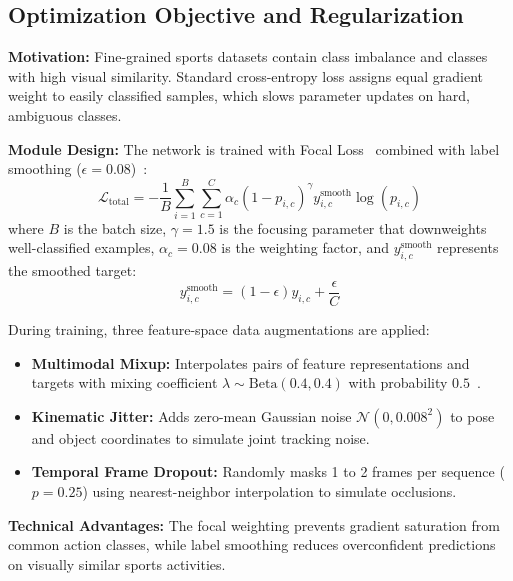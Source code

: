 \documentclass[conference]{IEEEtran}
\begin{document}
\subsection{Optimization Objective and Regularization}
\textbf{Motivation:} Fine-grained sports datasets contain class imbalance and classes with high visual similarity. Standard cross-entropy loss assigns equal gradient weight to easily classified samples, which slows parameter updates on hard, ambiguous classes.

\textbf{Module Design:} The network is trained with Focal Loss~\cite{lin2017focal} combined with label smoothing ($\epsilon = 0.08$)~\cite{szegedy2016rethinking}:
\begin{equation}
\mathcal{L}_{\text{total}} = -\frac{1}{B} \sum_{i=1}^B \sum_{c=1}^C \alpha_c (1 - p_{i, c})^\gamma y_{i, c}^{\text{smooth}} \log(p_{i, c})
\end{equation}
where $B$ is the batch size, $\gamma = 1.5$ is the focusing parameter that downweights well-classified examples, $\alpha_c = 0.08$ is the weighting factor, and $y_{i, c}^{\text{smooth}}$ represents the smoothed target:
\begin{equation}
y_{i, c}^{\text{smooth}} = (1 - \epsilon) y_{i, c} + \frac{\epsilon}{C}
\end{equation}

During training, three feature-space data augmentations are applied:
\begin{itemize}
    \item \textbf{Multimodal Mixup:} Interpolates pairs of feature representations and targets with mixing coefficient $\lambda \sim \text{Beta}(0.4, 0.4)$ with probability $0.5$~\cite{zhang2017mixup}.
    \item \textbf{Kinematic Jitter:} Adds zero-mean Gaussian noise $\mathcal{N}(0, 0.008^2)$ to pose and object coordinates to simulate joint tracking noise.
    \item \textbf{Temporal Frame Dropout:} Randomly masks 1 to 2 frames per sequence ($p=0.25$) using nearest-neighbor interpolation to simulate occlusions.
\end{itemize}

\textbf{Technical Advantages:} The focal weighting prevents gradient saturation from common action classes, while label smoothing reduces overconfident predictions on visually similar sports activities.

\clearpage %



\end{document}
